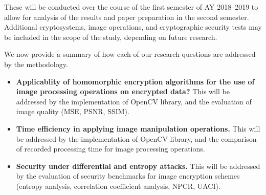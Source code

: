 These will be conducted over the course of the first semester of AY 2018--2019 to allow for analysis of the results and paper preparation in the second semester. Additional cryptosystems, image operations, and cryptographic security tests may be included in the scope of the study, depending on future research.

We now provide a summary of how each of our research questions are addressed by the methodology.
\begin{itemize}
	\item \textbf{Applicablity of homomorphic encryption algorithms for the use of image processing operations on encrypted data?} This will be addressed by the implementation of OpenCV library, and the evaluation of image quality (MSE, PSNR, SSIM).
	\item \textbf{Time efficiency in applying image manipulation operations.} This will be addressed by the implementation of OpenCV library, and the comparison of recorded processing time for image processing operations.
	\item \textbf{Security under differential and entropy attacks.}
	This will be addressed by the evaluation of security benchmarks for image encryption schemes (entropy analysis, correlation coefficient analysis, NPCR, UACI).
\end{itemize}
